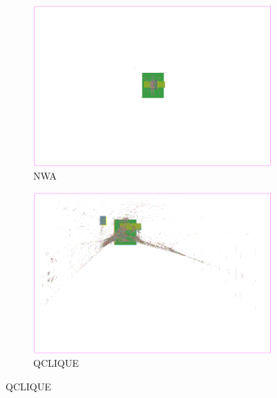 \begin{figure}[p]
 \centering

 \begin{subfigure}{.6\textwidth}
  \includegraphics[width=\textwidth]{hpwl_qclique_comparisons/placement_Chip2_NWA.png}
  \caption{NWA}
 \end{subfigure}
 
 \bigskip
 
 \begin{subfigure}{.6\textwidth}
  \includegraphics[width=\textwidth]{hpwl_qclique_comparisons/placement_Chip2_QCLIQUE.png}
  \caption{QCLIQUE}
 \end{subfigure}
 
 \bigskip
 

\end{figure}
